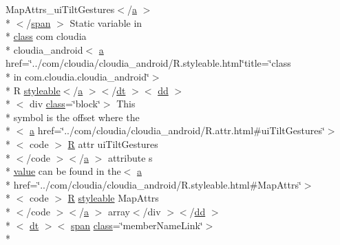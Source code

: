 \begin{DoxyCompactItemize}
 Map\-Attrs\-\_\-ui\-Tilt\-Gestures$<$/\hyperlink{style_8css_a5e8981582017bb8b84c21f148345d1f7}{a} $>$\\*
$<$/\hyperlink{stylesheet_8css_a8343996ebcf16220b04e54659aac31cc}{span} $>$ Static variable in \\*
\hyperlink{_tools_8html_acf06f836132665ba8114f5a414c2403f}{class} com cloudia \\*
cloudia\-\_\-android$<$ \hyperlink{style_8css_a5e8981582017bb8b84c21f148345d1f7}{a} href=\char`\"{}../com/cloudia/cloudia\-\_\-android/R.\-styleable.\-html\char`\"{}title=\char`\"{}class \\*
in com.\-cloudia.\-cloudia\-\_\-android\char`\"{}$>$\\*
 R \hyperlink{index-17_8html_ae6c9bf1e41380184b4b665ca9ab6ba0a}{styleable}$<$/\hyperlink{style_8css_a5e8981582017bb8b84c21f148345d1f7}{a} $>$$<$/\hyperlink{stylesheet_8css_a107565fb4039d33b041380d6e0ea1d80}{dt} $>$$<$ \hyperlink{stylesheet_8css_a47f4718a86835a7771ec592ece845221}{dd} $>$\\*
$<$ div \hyperlink{_tools_8html_acf06f836132665ba8114f5a414c2403f}{class}=\char`\"{}block\char`\"{}$>$ This \\*
symbol is the offset where the\\*
$<$ \hyperlink{style_8css_a5e8981582017bb8b84c21f148345d1f7}{a} href=\char`\"{}../com/cloudia/cloudia\-\_\-android/R.\-attr.\-html\#ui\-Tilt\-Gestures\char`\"{}$>$\\*
$<$ code $>$ \hyperlink{index-16_8html_a31e8fe59be5c20ce90a0090e28a0c1fe}{R} attr ui\-Tilt\-Gestures\\*
$<$/code $>$$<$/\hyperlink{style_8css_a5e8981582017bb8b84c21f148345d1f7}{a} $>$ attribute s \\*
\hyperlink{_my_s_q_l_connector_8measure_8html_afcc7a4b78ecd8fa7e713f8cfa0f51017}{value} can be found in the$<$ \hyperlink{style_8css_a5e8981582017bb8b84c21f148345d1f7}{a} \\*
href=\char`\"{}../com/cloudia/cloudia\-\_\-android/R.\-styleable.\-html\#Map\-Attrs\char`\"{}$>$\\*
$<$ code $>$ \hyperlink{index-16_8html_a31e8fe59be5c20ce90a0090e28a0c1fe}{R} \hyperlink{index-17_8html_ae6c9bf1e41380184b4b665ca9ab6ba0a}{styleable} Map\-Attrs\\*
$<$/code $>$$<$/\hyperlink{style_8css_a5e8981582017bb8b84c21f148345d1f7}{a} $>$ array$<$/div $>$$<$/\hyperlink{stylesheet_8css_a47f4718a86835a7771ec592ece845221}{dd} $>$\\*
$<$ \hyperlink{stylesheet_8css_a107565fb4039d33b041380d6e0ea1d80}{dt} $>$$<$ \hyperlink{stylesheet_8css_a8343996ebcf16220b04e54659aac31cc}{span} \hyperlink{_tools_8html_acf06f836132665ba8114f5a414c2403f}{class}=\char`\"{}member\-Name\-Link\char`\"{}$>$\\*

\end{DoxyCompactItemize}
